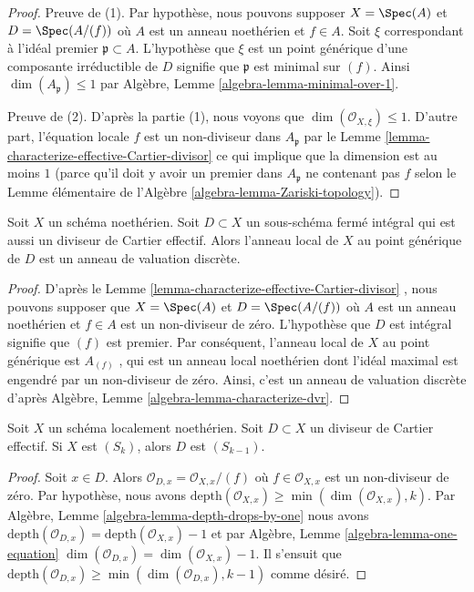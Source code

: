 \begin{proof}
Preuve de (1). Par hypothèse, nous pouvons supposer  $X = \Spec(A)$  et  $D = \Spec(A/(f))$ 
où  $A$  est un anneau noethérien et  $f \in A$. Soit  $\xi$ 
correspondant à l'idéal premier  $\mathfrak p \subset A$. L'hypothèse que  $\xi$  est un
point générique d'une composante irréductible de  $D$  signifie que
 $\mathfrak p$  est minimal sur  $(f)$. Ainsi  $\dim(A_\mathfrak p) \leq 1$  par Algèbre, Lemme
 \ref{algebra-lemma-minimal-over-1}.

\medskip\noindent
Preuve de (2). D'après la partie (1), nous voyons que  $\dim(\mathcal{O}_{X, \xi}) \leq 1$. D'autre part,
l'équation locale  $f$  est un non-diviseur dans  $A_\mathfrak p$  par le Lemme
 \ref{lemma-characterize-effective-Cartier-divisor}  ce qui implique que la dimension est au moins  $1$  (parce
qu'il doit y avoir un premier dans  $A_\mathfrak p$  ne contenant pas  $f$ 
selon le Lemme élémentaire de l'Algèbre  \ref{algebra-lemma-Zariski-topology}).
\end{proof}

\begin{lemma}
\label{lemma-integral-effective-Cartier-divisor-dvr}
Soit  $X$  un schéma noethérien. Soit  $D \subset X$  un sous-schéma fermé
intégral qui est aussi un diviseur de Cartier effectif. Alors l'anneau local de
 $X$  au point générique de  $D$  est un anneau de valuation
discrète.
\end{lemma}

\begin{proof}
D'après le Lemme  \ref{lemma-characterize-effective-Cartier-divisor} , nous pouvons supposer que  $X = \Spec(A)$  et
 $D = \Spec(A/(f))$  où  $A$  est un anneau noethérien et  $f \in A$  est un
non-diviseur de zéro. L'hypothèse que  $D$  est intégral signifie que
 $(f)$  est premier. Par conséquent, l'anneau local de  $X$  au point
générique est  $A_{(f)}$ , qui est un anneau local noethérien dont l'idéal
maximal est engendré par un non-diviseur de zéro. Ainsi, c'est un anneau de
valuation discrète d'après Algèbre, Lemme  \ref{algebra-lemma-characterize-dvr}.
\end{proof}

\begin{lemma}
\label{lemma-effective-Cartier-divisor-Sk}
Soit  $X$  un schéma localement noethérien. Soit  $D \subset X$  un diviseur
de Cartier effectif. Si  $X$  est  $(S_k)$, alors  $D$  est
 $(S_{k - 1})$.
\end{lemma}

\begin{proof}
Soit  $x \in D$. Alors  $\mathcal{O}_{D, x} = \mathcal{O}_{X, x}/(f)$  où  $f \in \mathcal{O}_{X, x}$  est un non-diviseur de zéro.
Par hypothèse, nous avons  $\text{depth}(\mathcal{O}_{X, x}) \geq \min(\dim(\mathcal{O}_{X, x}), k)$. Par Algèbre, Lemme  \ref{algebra-lemma-depth-drops-by-one}  nous avons
 $\text{depth}(\mathcal{O}_{D, x}) = \text{depth}(\mathcal{O}_{X, x}) - 1$  et par Algèbre, Lemme  \ref{algebra-lemma-one-equation}   $\dim(\mathcal{O}_{D, x}) = \dim(\mathcal{O}_{X, x}) - 1$. Il s'ensuit que
 $\text{depth}(\mathcal{O}_{D, x}) \geq \min(\dim(\mathcal{O}_{D, x}), k - 1)$  comme désiré.
\end{proof}

